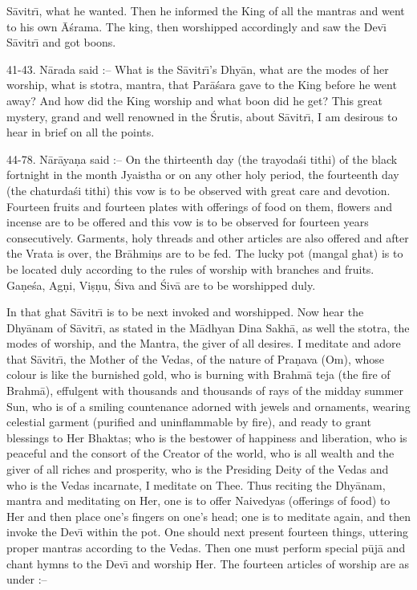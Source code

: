 S\=avitr\={\i}, what he wanted. Then he informed the King of all the mantras and went to his own \=A\'srama. The king, then worshipped accordingly and saw the Dev\={\i} S\=avitr\={\i} and got boons.

41-43. N\=arada said :-- What is the S\=avitr\={\i}'s Dhy\=an, what are the modes of her worship, what is stotra, mantra, that Par\=a\'sara gave to the King before he went away? And how did the King worship and what boon did he get? This great mystery, grand and well renowned in the \'Srutis, about S\=avitr\={\i}, I am desirous to hear in brief on all the points.

44-78. N\=ar\=aya\d{n}a said :-- On the thirteenth day (the trayoda\'si tithi) of the black fortnight in the month Jyaistha or on any other holy period, the fourteenth day (the chaturda\'si tithi) this vow is to be observed with great care and devotion. Fourteen fruits and fourteen plates with offerings of food on them, flowers and incense are to be offered and this vow is to be observed for fourteen years consecutively. Garments, holy threads and other articles are also offered and after the Vrata is over, the Br\=ahmi\d{n}s are to be fed. The lucky pot (mangal ghat) is to be located duly according to the rules of worship with branches and fruits. Ga\d{n}e\'sa, Ag\d{n}i, Vi\d{s}\d{n}u, \'Siva and \'Siv\=a are to be worshipped duly.

In that ghat S\=avitr\={\i} is to be next invoked and worshipped. Now hear the Dhy\=anam of S\=avitr\={\i}, as stated in the M\=adhyan Dina Sakh\=a, as well the stotra, the modes of worship, and the Mantra, the giver of all desires. I meditate and adore that S\=avitr\={\i}, the Mother of the Vedas, of the nature of Pra\d{n}ava (Om), whose colour is like the burnished gold, who is burning with Brahm\=a teja (the fire of Brahm\=a), effulgent with thousands and thousands of rays of the midday summer Sun, who is of a smiling countenance adorned with jewels and ornaments, wearing celestial garment (purified and uninflammable by fire), and ready to grant blessings to Her Bhaktas; who is the bestower of happiness and liberation, who is peaceful and the consort of the Creator of the world, who is all wealth and the giver of all riches and prosperity, who is the Presiding Deity of the Vedas and who is the Vedas incarnate, I meditate on Thee. Thus reciting the Dhy\=anam, mantra and meditating on Her, one is to offer Naivedyas (offerings of food) to Her and then place one's fingers on one's head; one is to meditate again, and then invoke the Dev\={\i} within the pot. One should next present fourteen things, uttering proper mantras according to the Vedas. Then one must perform special p\=uj\=a and chant hymns to the Dev\={\i} and worship Her. The fourteen articles of worship are as under :--

